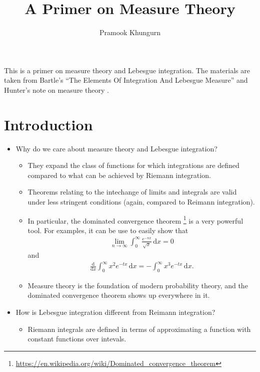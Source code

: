 \documentclass[10pt]{article}
\title{A Primer on Measure Theory}
\author{Pramook Khungurn}
\newcommand{\dee}{\mathrm{d}}
\begin{document}
\maketitle

This is a primer on measure theory and Lebesgue integration. The materials are taken from Bartle's ``The Elements Of Integration And Lebesgue Measure'' \cite{Bartle:1995} and Hunter's note on measure theory \cite{Hunter:2011}.

\section{Introduction}

\begin{itemize}
  \item Why do we care about measure theory and Lebesgue integration?
  \begin{itemize}
    \item They expand the class of functions for which integrations are defined compared to what can be achieved by Riemann integration.
    
    \item Theorems relating to the intechange of limits and integrals are valid under less stringent conditions (again, compared to Reimann integration).
    
    \item In particular, the dominated convergence theorem \footnote{\url{https://en.wikipedia.org/wiki/Dominated_convergence_theorem}} is a very powerful tool. For examples, it can be use to easily show that
    \begin{align*}
      \lim_{n \rightarrow \infty} \int_{0}^\infty \frac{e^{-nx}}{\sqrt{x}}\, \dee x = 0
    \end{align*}
    and
    \begin{align*}
        \frac{\dee}{\dee x} \int_{0}^\infty x^2 e^{-tx}\, \dee x = -\int_0^\infty x^3 e^{-tx}\, \dee x.
    \end{align*}
    
    \item Measure theory is the foundation of modern probability theory, and the dominated convergence theorem shows up everywhere in it.
  \end{itemize}
  
  \item How is Lebesgue integration different from Reimann integration?
  \begin{itemize}
    \item Riemann integrals are defined in terms of approximating a function with constant functions over intevals.
    

\end{itemize}
\end{itemize}
\end{document}
